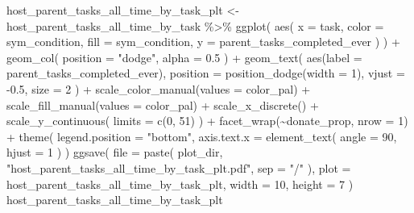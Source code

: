 \documentclass[
]{book}
\newenvironment{Shaded}{\begin{snugshade}}{\end{snugshade}}
\newcommand{\AttributeTok}[1]{\textcolor[rgb]{0.77,0.63,0.00}{#1}}
\newcommand{\DecValTok}[1]{\textcolor[rgb]{0.00,0.00,0.81}{#1}}
\newcommand{\FloatTok}[1]{\textcolor[rgb]{0.00,0.00,0.81}{#1}}
\newcommand{\FunctionTok}[1]{\textcolor[rgb]{0.00,0.00,0.00}{#1}}
\newcommand{\NormalTok}[1]{#1}
\newcommand{\OtherTok}[1]{\textcolor[rgb]{0.56,0.35,0.01}{#1}}
\newcommand{\SpecialCharTok}[1]{\textcolor[rgb]{0.00,0.00,0.00}{#1}}
\newcommand{\StringTok}[1]{\textcolor[rgb]{0.31,0.60,0.02}{#1}}
\begin{document}
\begin{Shaded}
\begin{Highlighting}[]
\NormalTok{host\_parent\_tasks\_all\_time\_by\_task\_plt }\OtherTok{\textless{}{-}}\NormalTok{ host\_parent\_tasks\_all\_time\_by\_task }\SpecialCharTok{\%\textgreater{}\%}
  \FunctionTok{ggplot}\NormalTok{(}
    \FunctionTok{aes}\NormalTok{(}
      \AttributeTok{x =}\NormalTok{ task,}
      \AttributeTok{color =}\NormalTok{ sym\_condition,}
      \AttributeTok{fill =}\NormalTok{ sym\_condition,}
      \AttributeTok{y =}\NormalTok{ parent\_tasks\_completed\_ever}
\NormalTok{    )}
\NormalTok{  ) }\SpecialCharTok{+}
  \FunctionTok{geom\_col}\NormalTok{(}
    \AttributeTok{position =} \StringTok{"dodge"}\NormalTok{,}
    \AttributeTok{alpha =} \FloatTok{0.5}
\NormalTok{  ) }\SpecialCharTok{+}
  \FunctionTok{geom\_text}\NormalTok{(}
    \FunctionTok{aes}\NormalTok{(}\AttributeTok{label =}\NormalTok{ parent\_tasks\_completed\_ever),}
    \AttributeTok{position =} \FunctionTok{position\_dodge}\NormalTok{(}\AttributeTok{width =} \DecValTok{1}\NormalTok{),}
    \AttributeTok{vjust =} \SpecialCharTok{{-}}\FloatTok{0.5}\NormalTok{,}
    \AttributeTok{size =} \DecValTok{2}
\NormalTok{  ) }\SpecialCharTok{+}
  \FunctionTok{scale\_color\_manual}\NormalTok{(}\AttributeTok{values =}\NormalTok{ color\_pal) }\SpecialCharTok{+}
  \FunctionTok{scale\_fill\_manual}\NormalTok{(}\AttributeTok{values =}\NormalTok{ color\_pal) }\SpecialCharTok{+}
  \FunctionTok{scale\_x\_discrete}\NormalTok{() }\SpecialCharTok{+}
  \FunctionTok{scale\_y\_continuous}\NormalTok{(}
    \AttributeTok{limits =} \FunctionTok{c}\NormalTok{(}\DecValTok{0}\NormalTok{, }\DecValTok{51}\NormalTok{)}
\NormalTok{  ) }\SpecialCharTok{+}
  \FunctionTok{facet\_wrap}\NormalTok{(}\SpecialCharTok{\textasciitilde{}}\NormalTok{donate\_prop, }\AttributeTok{nrow =} \DecValTok{1}\NormalTok{) }\SpecialCharTok{+}
  \FunctionTok{theme}\NormalTok{(}
    \AttributeTok{legend.position =} \StringTok{"bottom"}\NormalTok{,}
    \AttributeTok{axis.text.x =} \FunctionTok{element\_text}\NormalTok{(}
      \AttributeTok{angle =} \DecValTok{90}\NormalTok{,}
      \AttributeTok{hjust =} \DecValTok{1}
\NormalTok{    )}
\NormalTok{  )}
\FunctionTok{ggsave}\NormalTok{(}
  \AttributeTok{file =} \FunctionTok{paste}\NormalTok{(}
\NormalTok{    plot\_dir,}
    \StringTok{"host\_parent\_tasks\_all\_time\_by\_task\_plt.pdf"}\NormalTok{,}
    \AttributeTok{sep =} \StringTok{"/"}
\NormalTok{  ),}
  \AttributeTok{plot =}\NormalTok{ host\_parent\_tasks\_all\_time\_by\_task\_plt,}
  \AttributeTok{width =} \DecValTok{10}\NormalTok{,}
  \AttributeTok{height =} \DecValTok{7}
\NormalTok{)}
\NormalTok{host\_parent\_tasks\_all\_time\_by\_task\_plt}
\end{Highlighting}
\end{Shaded}
\end{document}
